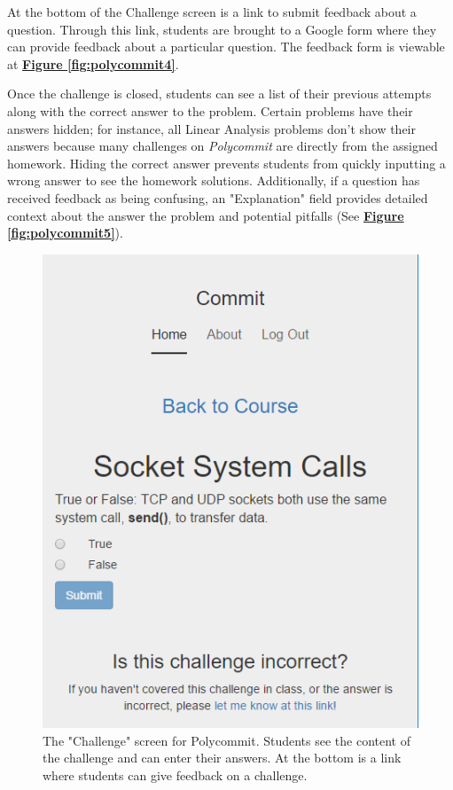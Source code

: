 \par At the bottom of the Challenge screen is a link to submit feedback about a question. Through this link, students are brought to a Google form where they can provide feedback about a particular question. The feedback form is viewable at \textbf{\hyperref[fig:polycommit4]{Figure \ref*{fig:polycommit4}}}.

\par Once the challenge is closed, students can see a list of their previous attempts along with the correct answer to the problem. Certain problems have their answers hidden; for instance, all Linear Analysis problems don't show their answers because many challenges on \textit{Polycommit} are directly from the assigned homework. Hiding the correct answer prevents students from quickly inputting a wrong answer to see the homework solutions. Additionally, if a question has received feedback as being confusing, an "Explanation" field provides detailed context about the answer the problem and potential pitfalls (See  \textbf{\hyperref[fig:polycommit5]{Figure \ref*{fig:polycommit5}}}).

\begin{figure}
	\includegraphics{figures/pc-question}
	\caption{The "Challenge" screen for Polycommit. Students see the content of the challenge and can enter their answers. At the bottom is a link where students can give feedback on a challenge.}
	\label{fig:polycommit3}
\end{figure}



